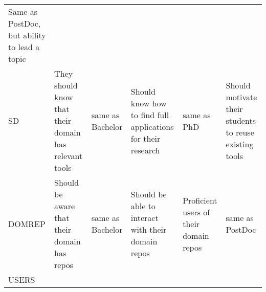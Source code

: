 \documentclass[a4paper
]{article}
\begin{document}
\begin{landscape}
\begin{longtable}[]{@{}llllll@{}}
\begin{minipage}[t]{0.09\columnwidth}
Same as PostDoc, but ability to lead a topic\strut
\end{minipage}\tabularnewline
\begin{minipage}[t]{0.12\columnwidth}\raggedright
SD\strut
\end{minipage} & \begin{minipage}[t]{0.18\columnwidth}\raggedright
They should know that their domain has relevant tools\strut
\end{minipage} & \begin{minipage}[t]{0.18\columnwidth}\raggedright
same as Bachelor\strut
\end{minipage} & \begin{minipage}[t]{0.09\columnwidth}\raggedright
Should know how to find full applications for their research\strut
\end{minipage} & \begin{minipage}[t]{0.18\columnwidth}\raggedright
same as PhD\strut
\end{minipage} & \begin{minipage}[t]{0.09\columnwidth}\raggedright
Should motivate their students to reuse existing tools\strut
\end{minipage}\tabularnewline
\begin{minipage}[t]{0.12\columnwidth}\raggedright
DOMREP\strut
\end{minipage} & \begin{minipage}[t]{0.18\columnwidth}\raggedright
Should be aware that their domain has repos\strut
\end{minipage} & \begin{minipage}[t]{0.18\columnwidth}\raggedright
same as Bachelor\strut
\end{minipage} & \begin{minipage}[t]{0.09\columnwidth}\raggedright
Should be able to interact with their domain repos\strut
\end{minipage} & \begin{minipage}[t]{0.18\columnwidth}\raggedright
Proficient users of their domain repos\strut
\end{minipage} & \begin{minipage}[t]{0.09\columnwidth}\raggedright
same as PostDoc\strut
\end{minipage}\tabularnewline
\begin{minipage}[t]{0.12\columnwidth}\raggedright
USERS\strut
\end{minipage} & \begin{minipage}[t]{0.18\columnwidth}\raggedright

\end{minipage}
\end{longtable}
\end{landscape}
\end{document}
